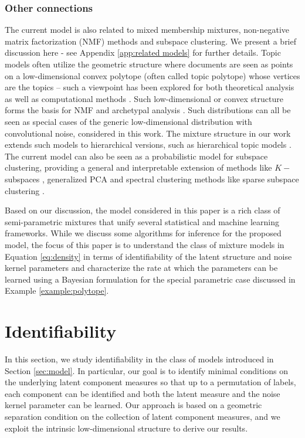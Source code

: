 \documentclass[bj,authoryear]{imsart}
\theoremstyle{plain}
\theoremstyle{remark}
\begin{document}
\subsubsection*{Other connections}
The current model is also related to mixed membership mixtures, non-negative matrix factorization (NMF) methods and subspace clustering. We present a brief discussion here - see Appendix \ref{app:related models} for further details. Topic models often utilize the geometric structure where documents are seen as points on a low-dimensional convex polytope (often called topic polytope) whose vertices are the topics -- such a viewpoint has been explored for both theoretical analysis as well as computational methods \cite{nguyen2015posterior, yurochkin2016geometric, yurochkin2019dirichlet, chen2023learning}. Such low-dimensional or convex structure forms the basis for NMF \cite{ding2008convex} and archetypal analysis \cite{cutler1994archetypal, javadi2020nonnegative}. Such distributions can all be seen as special cases of the generic low-dimensional distribution with convolutional noise, considered in this work. The mixture structure in our work extends such models to hierarchical versions, such as hierarchical topic models \cite{griffiths2003hierarchical, chakraborty2024learning}. The current model can also be seen as a probabilistic model for subspace clustering, providing a general and interpretable extension of methods like $K-$subspaces \cite{tseng2000nearest, zhang2009median}, generalized PCA \cite{vidal2005generalized} and spectral clustering methods like sparse subspace clustering \cite{elhamifar2013sparse}.


Based on our discussion, the model considered in this paper is a rich class of semi-parametric mixtures that unify several statistical and machine learning frameworks. While we discuss some algorithms for inference for the proposed model, the focus of this paper is to understand the class of mixture models in Equation \eqref{eq:density} in terms of identifiability of the latent structure and noise kernel parameters and characterize the rate at which the parameters can be learned using a Bayesian formulation for the special parametric case discussed in Example \ref{example:polytope}.

\section{Identifiability}\label{sec:identifiability}
In this section, we study identifiability in the class of models introduced in Section \ref{sec:model}. In particular, our goal is to identify minimal conditions on the underlying latent component measures so that up to a permutation of labels, each component can be identified and both the latent measure and the noise kernel parameter can be learned. Our approach is based on a geometric separation condition on the collection of latent component measures, and we exploit the intrinsic low-dimensional structure to derive our results.
\end{document}
